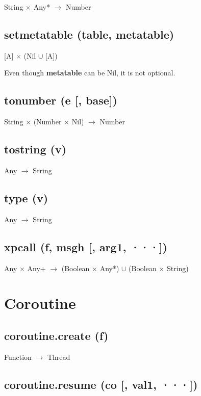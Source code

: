 \documentclass[12pt]{article}
\begin{document}
String $\times$ Any* $\rightarrow$ Number

\subsection{setmetatable (table, metatable)}

[A] $\times$ (Nil $\cup$ [A])

Even though \textbf{metatable} can be Nil, it is not optional.

\subsection{tonumber (e [, base])}

String $\times$ (Number $\times$ Nil) $\rightarrow$ Number

\subsection{tostring (v)}

Any $\rightarrow$ String

\subsection{type (v)}

Any $\rightarrow$ String

\subsection{xpcall (f, msgh [, arg1, ···])}

Any $\times$ Any+ $\rightarrow$
(Boolean $\times$ Any*) $\cup$
(Boolean $\times$ String)

\newpage

\section{Coroutine}

\subsection{coroutine.create (f)}

Function $\rightarrow$ Thread

\subsection{coroutine.resume (co [, val1, ···])}
\end{document}
